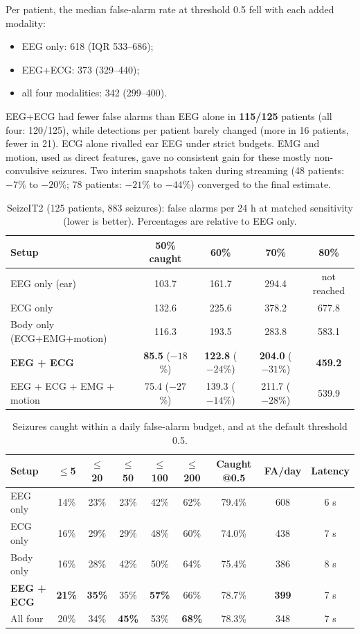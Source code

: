 Per patient, the median false-alarm rate at threshold 0.5 fell with each added modality:
\begin{itemize}
\item EEG only: 618 (IQR 533--686);
\item EEG+ECG: 373 (329--440);
\item all four modalities: 342 (299--400).
\end{itemize}
EEG+ECG had fewer false alarms than EEG alone in \textbf{115/125} patients (all four: 120/125), while detections per patient barely changed (more in 16 patients, fewer in 21). ECG alone rivalled ear EEG under strict budgets. EMG and motion, used as direct features, gave no consistent gain for these mostly non-convulsive seizures. Two interim snapshots taken during streaming (48 patients: $-7$\% to $-20$\%; 78 patients: $-21$\% to $-44$\%) converged to the final estimate.

\begin{table}[htbp]
\centering\small
\caption{SeizeIT2 (125 patients, 883 seizures): false alarms per 24 h at matched sensitivity (lower is better). Percentages are relative to EEG only.}
\label{tab:sz2main}
\begin{tabular}{@{}lcccc@{}}
\toprule
Setup & 50\% caught & 60\% & 70\% & 80\% \\
\midrule
EEG only (ear) & 103.7 & 161.7 & 294.4 & not reached \\
ECG only & 132.6 & 225.6 & 378.2 & 677.8 \\
Body only (ECG+EMG+motion) & 116.3 & 193.5 & 283.8 & 583.1 \\
\textbf{EEG + ECG} & \textbf{85.5} ($-18$\%) & \textbf{122.8} ($-24$\%) & \textbf{204.0} ($-31$\%) & \textbf{459.2} \\
EEG + ECG + EMG + motion & 75.4 ($-27$\%) & 139.3 ($-14$\%) & 211.7 ($-28$\%) & 539.9 \\
\bottomrule
\end{tabular}
\end{table}

\begin{table}[htbp]
\centering\small
\caption{Seizures caught within a daily false-alarm budget, and at the default threshold 0.5.}
\label{tab:sz2budget}
\setlength{\tabcolsep}{4.5pt}
\begin{tabular}{@{}lccccc|ccc@{}}
\toprule
Setup & $\le$5 & $\le$20 & $\le$50 & $\le$100 & $\le$200 & Caught @0.5 & FA/day & Latency \\
\midrule
EEG only & 14\% & 23\% & 23\% & 42\% & 62\% & 79.4\% & 608 & 6 s \\
ECG only & 16\% & 29\% & 29\% & 48\% & 60\% & 74.0\% & 438 & 7 s \\
Body only & 16\% & 28\% & 42\% & 50\% & 64\% & 75.4\% & 386 & 8 s \\
\textbf{EEG + ECG} & \textbf{21\%} & \textbf{35\%} & 35\% & \textbf{57\%} & 66\% & 78.7\% & \textbf{399} & 7 s \\
All four & 20\% & 34\% & \textbf{45\%} & 53\% & \textbf{68\%} & 78.3\% & 348 & 7 s \\
\bottomrule
\end{tabular}
\end{table}

